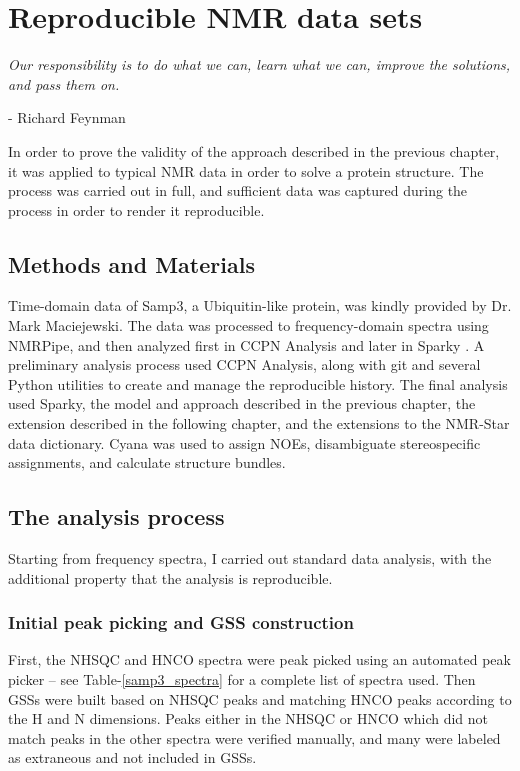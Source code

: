 \chapter{Reproducible NMR data sets}

\begin{center}
  \textit{Our responsibility is to do what we can, learn what we can, 
    improve the solutions, and pass them on.}

 - Richard Feynman
\end{center}


In order to prove the validity of the approach described in the previous
chapter, it was applied to typical NMR data in order to solve a protein
structure.  The process was carried out in full, and sufficient data was
captured during the process in order to render it reproducible.


\section{Methods and Materials}

Time-domain data of Samp3, a Ubiquitin-like protein, was kindly provided by 
Dr. Mark Maciejewski.  The data was processed to frequency-domain spectra
using NMRPipe, and then analyzed first in CCPN Analysis \cite{ccpn} and later 
in Sparky \cite{sparky}.  A preliminary analysis process used CCPN Analysis,
along with git and several Python utilities to create and manage the 
reproducible history.  The final analysis used Sparky, the model and approach
described in the previous chapter, the extension described in the following
chapter, and the extensions to the NMR-Star data dictionary.  
Cyana was used to assign NOEs,
disambiguate stereospecific assignments, and calculate structure bundles.


\section{The analysis process}
Starting from frequency spectra, I carried out standard data analysis,
with the additional property that the analysis is reproducible.

\subsection{Initial peak picking and GSS construction}
First, the NHSQC and HNCO spectra were peak picked using an automated 
peak picker -- see Table-\ref{samp3_spectra} for a complete list of spectra
used.  Then GSSs were built based on NHSQC peaks and matching HNCO peaks
according to the H and N dimensions.  Peaks either in the NHSQC or HNCO
which did not match peaks in the other spectra were verified manually, and
many were labeled as extraneous and not included in GSSs.

